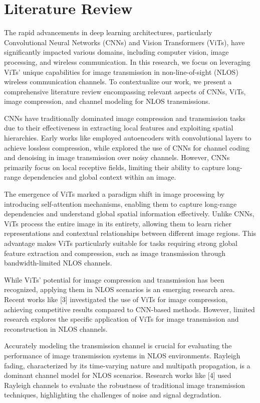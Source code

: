 \documentclass[10pt,twocolumn]{IEEEtran}
\begin{document}
\section{Literature Review}
The rapid advancements in deep learning architectures, particularly Convolutional Neural Networks (CNNs) and Vision Transformers (ViTs), have significantly impacted various domains, including computer vision, image processing, and wireless communication. In this research, we focus on leveraging ViTs' unique capabilities for image transmission in non-line-of-sight (NLOS) wireless communication channels. To contextualize our work, we present a comprehensive literature review encompassing relevant aspects of CNNs, ViTs, image compression, and channel modeling for NLOS transmissions.

CNNs have traditionally dominated image compression and transmission tasks due to their effectiveness in extracting local features and exploiting spatial hierarchies. Early works like \cite{cheng2018deep} employed autoencoders with convolutional layers to achieve lossless compression, while \cite{saber2022list} explored the use of CNNs for channel coding and denoising in image transmission over noisy channels. However, CNNs primarily focus on local receptive fields, limiting their ability to capture long-range dependencies and global context within an image.

The emergence of ViTs marked a paradigm shift in image processing by introducing self-attention mechanisms, enabling them to capture long-range dependencies and understand global spatial information effectively. Unlike CNNs, ViTs process the entire image in its entirety, allowing them to learn richer representations and contextual relationships between different image regions. This advantage makes ViTs particularly suitable for tasks requiring strong global feature extraction and compression, such as image transmission through bandwidth-limited NLOS channels.

While ViTs' potential for image compression and transmission has been recognized, applying them in NLOS scenarios is an emerging research area. Recent works like [3] investigated the use of ViTs for image compression, achieving competitive results compared to CNN-based methods. However, limited research explores the specific application of ViTs for image transmission and reconstruction in NLOS channels.

Accurately modeling the transmission channel is crucial for evaluating the performance of image transmission systems in NLOS environments. Rayleigh fading, characterized by its time-varying nature and multipath propagation, is a dominant channel model for NLOS scenarios. Research works like [4] used Rayleigh channels to evaluate the robustness of traditional image transmission techniques, highlighting the challenges of noise and signal degradation.
\end{document}
